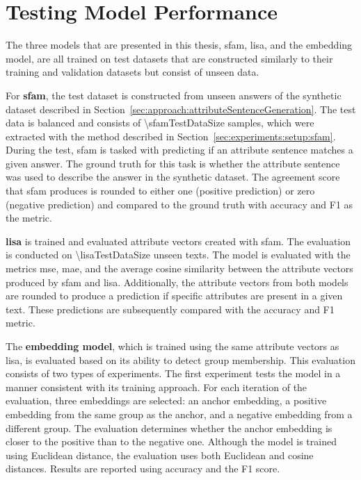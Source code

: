 \section{Testing Model Performance}
\label{sec:experiments:models}
The three models that are presented in this thesis, \ac{sfam}, \ac{lisa}, and the embedding model, are all trained on test datasets that are constructed similarly to their training and validation datasets but consist of unseen data.

For \textbf{\ac{sfam}}, the test dataset is constructed from unseen answers of the synthetic dataset described in Section~\ref{sec:approach:attributeSentenceGeneration}. The test data is balanced and consists of \num{\sfamTestDataSize} samples, which were extracted with the method described in Section~\ref{sec:experiments:setup:sfam}.
During the test, \ac{sfam} is tasked with predicting if an attribute sentence matches a given answer. The ground truth for this task is whether the attribute sentence was used to describe the answer in the synthetic dataset. The agreement score that \ac{sfam} produces is rounded to either one (positive prediction) or zero (negative prediction) and compared to the ground truth with accuracy and F1 as the metric.

\textbf{\ac{lisa}} is trained and evaluated attribute vectors created with \ac{sfam}. The evaluation is conducted on \num{\lisaTestDataSize} unseen texts. The model is evaluated with the metrics \ac{mse}, \ac{mae}, and the average cosine similarity between the attribute vectors produced by \ac{sfam} and \ac{lisa}. Additionally, the attribute vectors from both models are rounded to produce a prediction if specific attributes are present in a given text. These predictions are subsequently compared with the accuracy and F1 metric.

The \textbf{embedding model}, which is trained using the same attribute vectors as \ac{lisa}, is evaluated based on its ability to detect group membership. This evaluation consists of two types of experiments. The first experiment tests the model in a manner consistent with its training approach. For each iteration of the evaluation, three embeddings are selected: an anchor embedding, a positive embedding from the same group as the anchor, and a negative embedding from a different group. The evaluation determines whether the anchor embedding is closer to the positive than to the negative one. Although the model is trained using Euclidean distance, the evaluation uses both Euclidean and cosine distances. Results are reported using accuracy and the F1 score.

